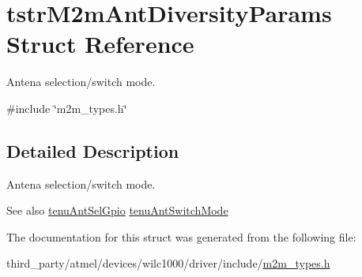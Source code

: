 \hypertarget{structtstrM2mAntDiversityParams}{}\section{tstr\+M2m\+Ant\+Diversity\+Params Struct Reference}
\label{structtstrM2mAntDiversityParams}


Antena selection/switch mode.  




{\ttfamily \#include \char`\"{}m2m\+\_\+types.\+h\char`\"{}}



\subsection{Detailed Description}
Antena selection/switch mode. 

\begin{DoxySeeAlso}{See also}
\hyperlink{group__WlanEnums_ga79d8d22335f19b2d3a8cc95b915792ce}{tenu\+Ant\+Sel\+Gpio} \hyperlink{group__WlanEnums_ga2060d527c27ea7770fea3cd48c55dac6}{tenu\+Ant\+Switch\+Mode} 
\end{DoxySeeAlso}


The documentation for this struct was generated from the following file\+:\begin{DoxyCompactItemize}
\item 
third\+\_\+party/atmel/devices/wilc1000/driver/include/\hyperlink{m2m__types_8h}{m2m\+\_\+types.\+h}\end{DoxyCompactItemize}
